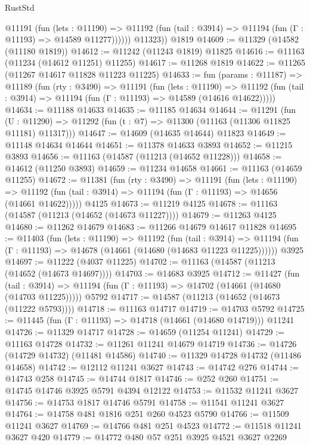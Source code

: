 \begin{lexlean}{RustStd}
\begin{coremodule}
            @11191
              (fun (lets : @11190) =>
              @11192 (fun (tail : @3914) => @11194 (fun (Γ : @11193) => @14589 @11277))))))
        @11323))
    @1819
@14609 := @11329 (@14582 (@11180 @1819))
@14612 := @11242 (@11243 @1819) @11825
@14616 := @11163 (@11234 (@14612 @11251) @11255)
@14617 := @11268 @1819
@14622 := @11265 (@11267 @14617 @11828 @11223 @11225)
@14633 := fun (params : @11187) =>
  @11189
    (fun (rty : @3490) =>
    @11191
      (fun (lets : @11190) =>
      @11192 (fun (tail : @3914) => @11194 (fun (Γ : @11193) => @14589 (@14616 @14622)))))
@14634 := @11188 @14633
@14635 := @11185 @14634
@14644 := @11291
    (fun (U : @11290) => @11292 (fun (t : @7) => @11300 (@11163 (@11306 @11825 @11181) @11317)))
@14647 := @14609 (@14635 @14644) @11823
@14649 := @11148 @14634 @14644
@14651 := @11378 @14633 @3893
@14652 := @11215 @3893
@14656 := @11163 (@14587 (@11213 (@14652 @11228)))
@14658 := @14612 (@11250 @3893)
@14659 := @11234 @14658
@14661 := @11163 (@14659 @11255)
@14672 := @11381
    (fun (rty : @3490) =>
    @11191
      (fun (lets : @11190) =>
      @11192 (fun (tail : @3914) => @11194 (fun (Γ : @11193) => @14656 (@14661 @14622)))))
    @4125
@14673 := @11219 @4125
@14678 := @11163 (@14587 (@11213 (@14652 (@14673 @11227))))
@14679 := @11263 @4125
@14680 := @11262 @14679
@14683 := @11266 @14679 @14617 @11828
@14695 := @11403
    (fun (lets : @11190) =>
    @11192
      (fun (tail : @3914) =>
      @11194 (fun (Γ : @11193) => @14678 (@14661 (@14680 (@14683 @11223 @11225))))))
    @3925
@14697 := @11222 (@4037 @11225)
@14702 := @11163 (@14587 (@11213 (@14652 (@14673 @14697))))
@14703 := @14683 @3925
@14712 := @11427
    (fun (tail : @3914) => @11194 (fun (Γ : @11193) => @14702 (@14661 (@14680 (@14703 @11225)))))
    @5792
@14717 := @14587 (@11213 (@14652 (@14673 (@11222 @5793))))
@14718 := @11163 @14717
@14719 := @14703 @5792
@14725 := @11445 (fun (Γ : @11193) => @14718 (@14661 (@14680 @14719))) @11241
@14726 := @11329 @14717
@14728 := @14659 (@11254 @11241)
@14729 := @11163 @14728
@14732 := @11261 @11241 @14679 @14719
@14736 := @14726 (@14729 @14732) (@11481 @14586)
@14740 := @11329 @14728 @14732 (@11486 @14658)
@14742 := @12112 @11241 @3627
@14743 := @14742 @276
@14744 := @14743 @258
@14745 := @14744 @1817
@14746 := @252 @260
@14751 := @14745 @14746 @3925 @5791 @4394 @12122
@14753 := @11532 @11241 @3627
@14756 := @14753 @1817 @14746 @5791
@14758 := @11541 @11241 @3627
@14764 := @14758 @481 @1816 @251 @260 @4523 @5790
@14766 := @11509 @11241 @3627
@14769 := @14766 @481 @251 @4523
@14772 := @11518 @11241 @3627 @420
@14779 := @14772 @480 @57 @251 @3925 @4521 @3627 @2269

\end{coremodule}
\end{lexlean}

